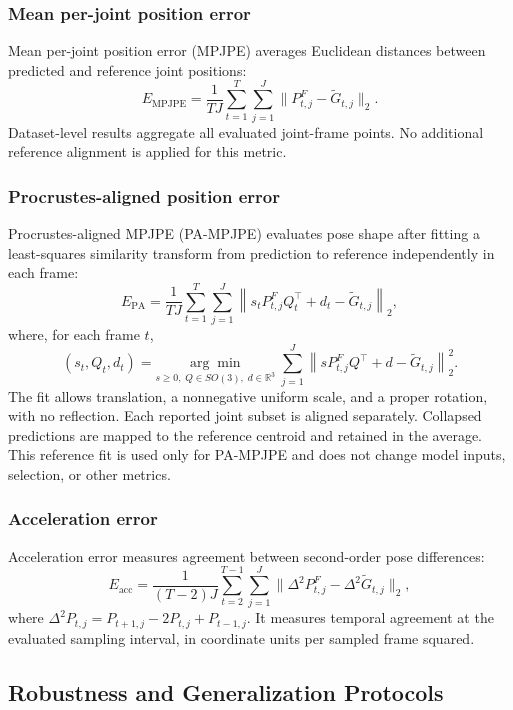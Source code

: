 \documentclass[preprint,12pt]{elsarticle}
\begin{document}
\subsubsection{Mean per-joint position error}
Mean per-joint position error (MPJPE) averages Euclidean distances between predicted and reference joint positions:
\[
E_{\mathrm{MPJPE}}=\frac{1}{TJ}\sum_{t=1}^{T}\sum_{j=1}^{J}\|P^F_{t,j}-\tilde{G}_{t,j}\|_2.
\]
Dataset-level results aggregate all evaluated joint-frame points. No additional reference alignment is applied for this metric.

\subsubsection{Procrustes-aligned position error}
Procrustes-aligned MPJPE (PA-MPJPE) evaluates pose shape after fitting a least-squares similarity transform from prediction to reference independently in each frame:
\[
E_{\mathrm{PA}}=\frac{1}{TJ}\sum_{t=1}^{T}\sum_{j=1}^{J}\left\|s_t P^F_{t,j}Q_t^{\top}+d_t-\tilde{G}_{t,j}\right\|_2,
\]
where, for each frame \(t\),
\[
(s_t,Q_t,d_t)=\underset{s\geq0,\;Q\in SO(3),\;d\in\mathbb{R}^3}{\arg\min}\;\sum_{j=1}^{J}\left\|sP^F_{t,j}Q^{\top}+d-\tilde{G}_{t,j}\right\|_2^2 .
\]
The fit allows translation, a nonnegative uniform scale, and a proper rotation, with no reflection. Each reported joint subset is aligned separately. Collapsed predictions are mapped to the reference centroid and retained in the average. This reference fit is used only for PA-MPJPE and does not change model inputs, selection, or other metrics.

\subsubsection{Acceleration error}
Acceleration error measures agreement between second-order pose differences:
\[
E_{\mathrm{acc}}=\frac{1}{(T-2)J}\sum_{t=2}^{T-1}\sum_{j=1}^{J}
\|\Delta^2 P^F_{t,j}-\Delta^2\tilde{G}_{t,j}\|_2,
\]
where \(\Delta^2 P_{t,j}=P_{t+1,j}-2P_{t,j}+P_{t-1,j}\). It measures temporal agreement at the evaluated sampling interval, in coordinate units per sampled frame squared.

\subsection{Robustness and Generalization Protocols}
\label{subsec:controlled_protocol}
\end{document}
